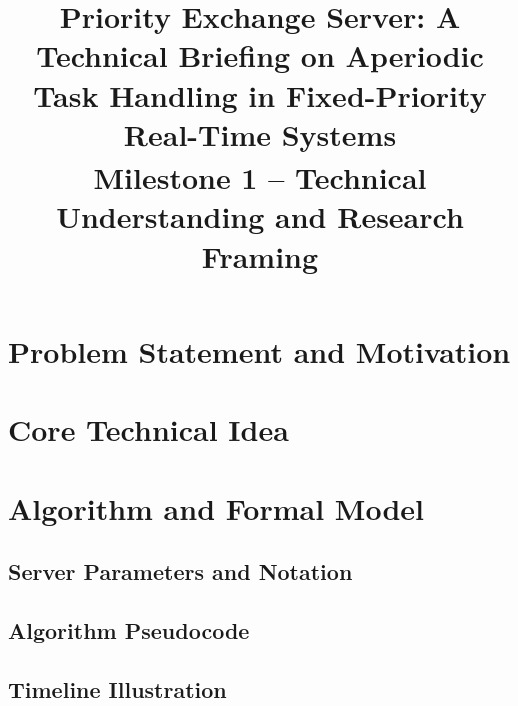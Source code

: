 \documentclass[conference]{IEEEtran}
\begin{document}
\title{Priority Exchange Server: A Technical Briefing on Aperiodic Task Handling in Fixed-Priority Real-Time Systems\\
{\footnotesize \textsuperscript{}Milestone 1 -- Technical Understanding and Research Framing}
}

\author{
}

\maketitle

\begin{abstract}
\end{abstract}

\begin{IEEEkeywords}
\end{IEEEkeywords}

\section{Problem Statement and Motivation}
\section{Core Technical Idea}
\section{Algorithm and Formal Model}

\subsection{Server Parameters and Notation}

\subsection{Algorithm Pseudocode}

\subsection{Timeline Illustration}
\end{document}
